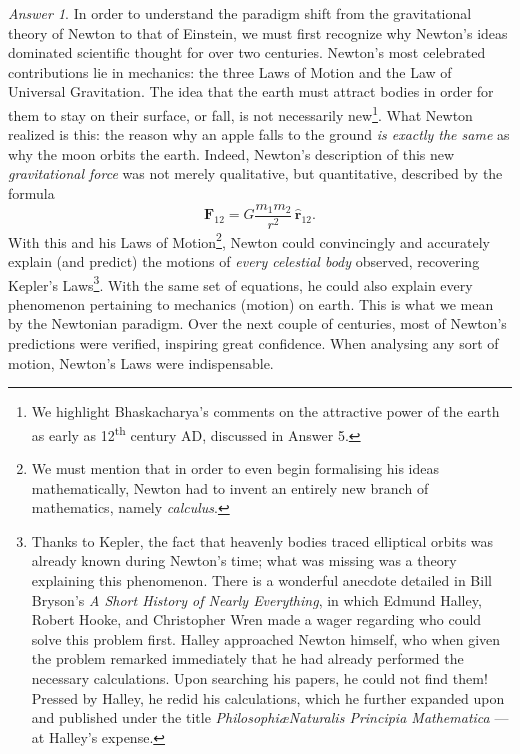\documentclass[11pt]{article}
\theoremstyle{remark}
\newtheorem*{answer}{Answer}
\begin{document}
\begin{answer}
        In order to understand the paradigm shift from the gravitational theory of
        Newton to that of Einstein, we must first recognize why Newton's ideas
        dominated scientific thought for over two centuries. Newton's most celebrated
        contributions lie in mechanics: the three Laws of Motion and the Law of
        Universal Gravitation. The idea that the earth must attract bodies in order
        for them to stay on their surface, or fall, is not necessarily
        new\footnote{We highlight Bhaskacharya's comments on the attractive power of
        the earth as early as 12\textsuperscript{th} century AD, discussed in Answer
        5.}. What Newton realized is this: the reason why an apple falls to the
        ground \emph{is exactly the same} as why the moon orbits the earth. Indeed,
        Newton's description of this new \emph{gravitational force} was not merely
        qualitative, but quantitative, described by the formula \[
            \mathbf{F}_{12} = G \frac{m_1m_2}{r^2}\, \hat{\mathbf{r}}_{12}.
        \] With this and his Laws of Motion\footnote{We must mention that in order to
        even begin formalising his ideas mathematically, Newton had to invent an
        entirely new branch of mathematics, namely \emph{calculus}.}, Newton could
        convincingly and accurately explain (and predict) the motions of \emph{every
        celestial body} observed, recovering Kepler's Laws\footnote{Thanks to Kepler,
        the fact that heavenly bodies traced elliptical orbits was already known
        during Newton's time; what was missing was a theory explaining this
        phenomenon. There is a wonderful anecdote detailed in Bill Bryson's \emph{A
        Short History of Nearly Everything}, in which Edmund Halley, Robert Hooke,
        and Christopher Wren made a wager regarding who could solve this problem
        first. Halley approached Newton himself, who when given the problem remarked
        immediately that he had already performed the necessary calculations. Upon
        searching his papers, he could not find them! Pressed by Halley, he redid his
        calculations, which he further expanded upon and published under the title
        \emph{Philosophi\ae Naturalis Principia Mathematica} --- at Halley's
        expense.}. With the same set of equations, he could also explain every
        phenomenon pertaining to mechanics (motion) on earth. This is what we mean by
        the Newtonian paradigm. Over the next couple of centuries, most of Newton's
        predictions were verified, inspiring great confidence. When analysing any
        sort of motion, Newton's Laws were indispensable.


\end{answer}
\end{document}
